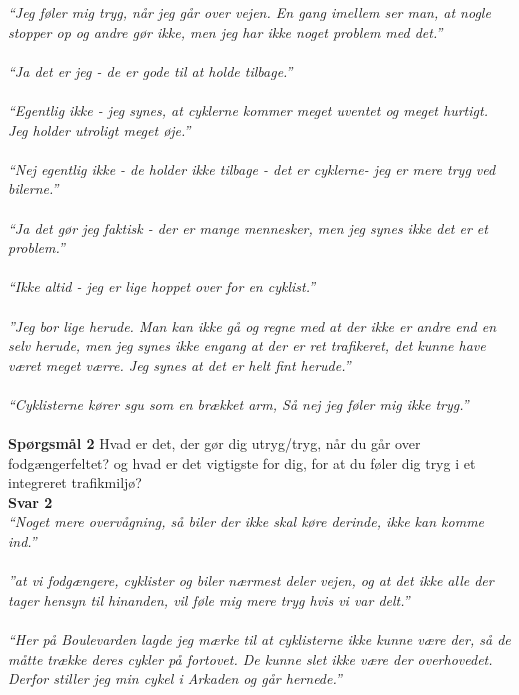   \emph{“Jeg føler mig tryg, når jeg går over vejen. En gang imellem ser man, at nogle stopper op og andre gør ikke, men jeg har ikke noget problem med det.”}
~\\\\
  \emph{“Ja det er jeg - de er gode til at holde tilbage.”}
~\\\\
  \emph{“Egentlig ikke - jeg synes, at cyklerne kommer meget uventet og meget hurtigt. Jeg holder utroligt meget øje.”}
~\\\\
\emph{“Nej egentlig ikke - de holder ikke tilbage - det er cyklerne- jeg er mere tryg ved bilerne.”}
~\\\\
\emph{“Ja det gør jeg faktisk - der er mange mennesker, men jeg synes ikke det er et problem.”}
~\\\\
  \emph{“Ikke altid - jeg er lige hoppet over for en cyklist.”}
~\\\\
  \emph{”Jeg bor lige herude. Man kan ikke gå og regne med at der ikke er andre end en selv herude, men jeg synes ikke engang at der er ret trafikeret, det kunne have været meget værre. Jeg synes at det er helt fint herude.”}
~\\\\
  \emph{“Cyklisterne kører sgu som en brækket arm, Så nej jeg føler mig ikke tryg.”}
~\\\\
  \textbf{Spørgsmål 2}
  Hvad er det, der gør dig utryg/tryg, når du går over fodgængerfeltet? og hvad er det vigtigste for dig, for at du føler dig tryg i et integreret trafikmiljø?
~\\
  \textbf{Svar 2} ~\\
\emph{“Noget mere overvågning, så biler der ikke skal køre derinde, ikke kan komme ind.”}
~\\\\
  \emph{”at vi fodgængere, cyklister og biler nærmest deler vejen, og at det ikke alle der tager hensyn til hinanden, vil føle mig mere tryg hvis vi var delt.”}
~\\\\
  \emph{“Her på Boulevarden lagde jeg mærke til at cyklisterne ikke kunne være der, så de måtte trække deres cykler på fortovet. De kunne slet ikke være der overhovedet.  Derfor stiller jeg min cykel i Arkaden og går hernede.”}
~\\\\
